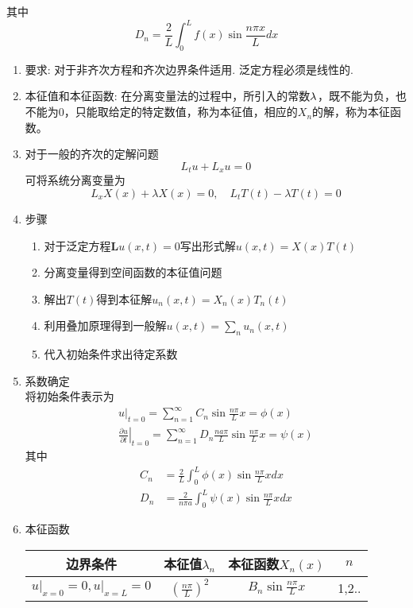 \documentclass[UTF8,8pt]{ctexart}
\begin{document}
\begin{multicols}{2}
$$    $$
    其中
    $$ 
    D_{n}=\frac{2}{L} \int_{0}^{L} f(x) \sin \frac{n \pi x}{L} d x$$
    \begin{enumerate}
    \item 要求: 对于非齐次方程和齐次边界条件适用. 泛定方程必须是线性的. 
    \item 本征值和本征函数: 在分离变量法的过程中，所引入的常数$\lambda$，既不能为负，也不能为0，只能取给定的特定数值，称为本征值，相应的$X_n$的解，称为本征函数。
    \item 对于一般的齐次的定解问题
    $$ 
    L_{t} u+L_{x} u=0
    $$可将系统分离变量为
    $$ 
    L_{x} X(x)+\lambda X(x)=0
    ,\quad
    L_{t} T(t)-\lambda T(t)=0
    $$
    \item 步骤
    \begin{enumerate}
    \item 对于泛定方程$\mathbf{L} u(x, t)=0$写出形式解$u(x, t)=X(x) T(t)$
    \item 分离变量得到空间函数的本征值问题
    \item 解出$T(t)$得到本征解$u_{n}(x, t)=X_{n}(x) T_{n}(t)$
    \item 利用叠加原理得到一般解$u(x, t)=\sum_{n} u_{n}(x, t)$
    \item 代入初始条件求出待定系数
    \end{enumerate}
    \item 系数确定\\
    将初始条件表示为$$ 
    \begin{array}{l}{u|_{t=0}=\sum_{n=1}^{\infty} C_{n} \sin \frac{n \pi}{L} x=\phi(x)} \\ {\left.\frac{\partial u}{\partial t}\right|_{t=0}=\sum_{n=1}^{\infty} D_{n} \frac{n a \pi}{L} \sin \frac{n \pi}{L} x=\psi(x)}\end{array}
    $$其中$$ 
    \begin{aligned} C_{n} &=\frac{2}{L} \int_{0}^{L} \phi(x) \sin \frac{n \pi}{L} x d x \\ D_{n} &=\frac{2}{n \pi a} \int_{0}^{L} \psi(x) \sin \frac{n \pi}{L} x d x \end{aligned}
    $$
    \item 本征函数\\
    \begin{tabular}{|c|c|c|c|}
    \hline
    边界条件                 & 本征值$\lambda_{n}$               & 本征函数$X_{n}(x)$                                        & $n$ \\ \hline
    $\left.u\right|_{x=0}=0,\left.u\right|_{x=L}=0$                                                         & $\left(\frac{n \pi}{L}\right)^{2}$         & $B_{n} \sin \frac{n \pi}{L} x$         & 1,2..  \\ \hline

\end{tabular}
\end{enumerate}
\end{multicols}
\end{document}
